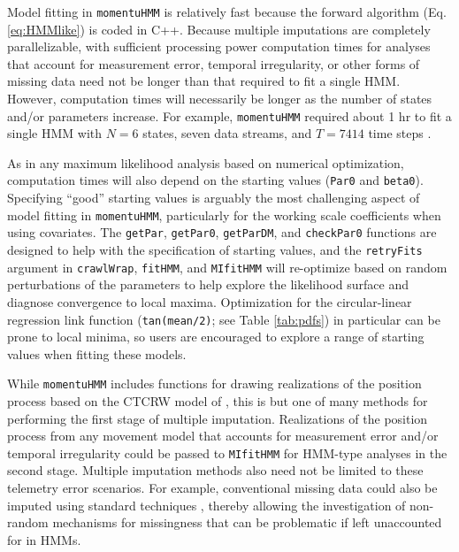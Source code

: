 \documentclass[12pt]{article}\usepackage[]{graphicx}\usepackage[]{color}
\begin{document}
Model fitting in \verb|momentuHMM| is relatively fast because the forward algorithm (Eq. \ref{eq:HMMlike}) is coded in C++. Because multiple imputations are completely parallelizable, with sufficient processing power computation times for analyses that account for measurement error, temporal irregularity, or other forms of missing data need not be longer than that required to fit a single HMM.  However, computation times will necessarily be longer as the number of states and/or parameters increase. For example, \verb|momentuHMM| required about 1 hr to fit a single HMM with $N=6$ states, seven data streams, and $T=7414$ time steps \citep{McClintock2017}. 

As in any maximum likelihood analysis based on numerical optimization, computation times will also depend on the starting values (\verb|Par0| and \verb|beta0|). Specifying ``good'' starting values is arguably the most challenging aspect of model fitting in \verb|momentuHMM|, particularly for the working scale coefficients when using covariates. The \verb|getPar|, \verb|getPar0|, \verb|getParDM|, and \verb|checkPar0| functions are designed to help with the specification of starting values, and the \verb|retryFits| argument in \verb|crawlWrap|, \verb|fitHMM|, and \verb|MIfitHMM| will re-optimize based on random perturbations of the parameters to help explore the likelihood surface and diagnose convergence to local maxima. Optimization for the circular-linear regression link function (\verb|tan(mean/2)|; see Table \ref{tab:pdfs}) in particular can be prone to local minima, so users are encouraged to explore a range of starting values when fitting these models.

While \verb|momentuHMM| includes functions for drawing realizations of the position process based on the CTCRW model of \cite{JohnsonEtAl2008}, this is but one of many methods for performing the first stage of multiple imputation. Realizations of the position process from any movement model that accounts for measurement error and/or temporal irregularity \citep[e.g.][]{CalabreseEtAl2016,GurarieEtAl2017} could be passed to \verb|MIfitHMM| for HMM-type analyses in the second stage. Multiple imputation methods also need not be limited to these telemetry error scenarios. For example, conventional missing data could also be imputed using standard techniques \citep{RubinSchenker1986}, thereby allowing the investigation of non-random mechanisms for missingness that can be problematic if left unaccounted for in HMMs.
\end{document}
